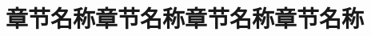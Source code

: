 \documentclass[color=orange]{textbook-cn}%
\begin{document}
\begin{Appendix}
\DeepThink{\lipsum[2]}

\Remark{\lipsum[2]}






\clearpage
\begin{Block}[测试标题]
\lipsum[1-4]\par\lipsum[5][1-4]
\end{Block}


\chapter*{章节名称章节名称章节名称章节名称}
\lipsum
\lipsum




\newcommand{\wx}{\underline{~~\thewxcounter\refstepcounter{wxcounter}~~}}

\begin{Reading}{5}{3}
\lipsum[2]
\end{Reading}



\end{Appendix}
\end{document}
